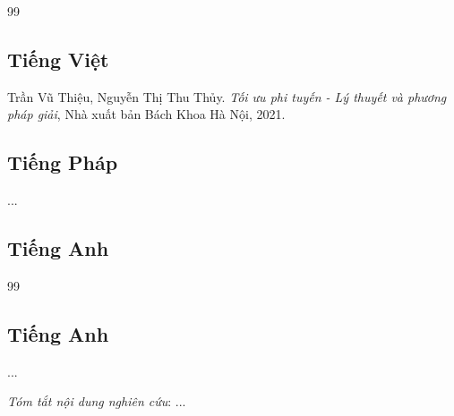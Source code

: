 \begin{thebibliography}{99}\rm
{}

\subsection*{Tiếng Việt}

 Trần Vũ Thiệu, Nguyễn Thị Thu Thủy. \textit{Tối ưu phi tuyến - Lý thuyết và phương pháp giải}, Nhà xuất bản Bách Khoa Hà Nội, 2021.

\subsection*{Tiếng Pháp}
 ...


\subsection*{Tiếng Anh}

\end{thebibliography}

\setcounter{lastbibitem}{\value{enumiv}}

\renewcommand{\bibname}{Công trình nghiên cứu liên quan}
\begin{thebibliography}{99}\rm
{}
\setcounter{enumiv}{\value{lastbibitem}}

\subsection*{Tiếng Anh}
 ...
\end{thebibliography}

\textit{Tóm tắt nội dung nghiên cứu}: ...

